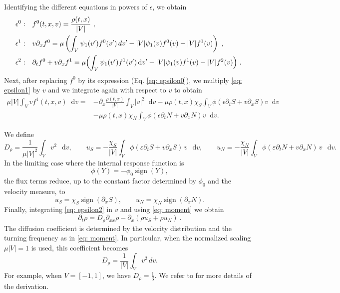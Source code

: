 \documentclass[11pt,twoside]{article}
\DeclareMathOperator{\sign}{sign}
\newcommand*\diff{\mathop{}\!\mathrm{d}}
\theoremstyle{plain}
\theoremstyle{nonumberplain}
\begin{document}
\noindent Identifying the different equations in powers of $\epsilon$, we obtain
\fi
\begin{align}
    \epsilon^0: & \quad f^0(t,{x},{v})=\frac{\rho(t,{x})}{|V|}\ ,\label{eq: epsilon0}\\
    \epsilon^1: & \quad 
    v \partial_x f^0
=
\mu \left(
\int_V \psi_1(v') f^0(v')\,dv'
- |V| \psi_1(v) f^0(v)
- |V| f^1(v)
\right)\ ,\label{eq: epsilon1}\\
    \epsilon^2: & \quad \partial_tf^0+{v}\partial_x f^1 =\mu\Bigl(\int_V\psi_1(v')f^1(v')\diff v'-|V|\psi_1(v)f^1(v)-|V|f^2(v)\Bigr) \ \label{eq: epsilon2}.\
\end{align}
Next, after replacing $f^0$ by its expression (Eq. \eqref{eq: epsilon0}), we multiply \eqref{eq: epsilon1} by ${v}$ and we integrate again with respect to ${v}$ to obtain
\begin{align}
    \mu|V|\int_V vf^1(t,x,v) \diff v=&-\partial_x\frac{\rho(t,x)}{|V|}\int_V |v|^2\diff v-\mu\rho(t,x)\chi_S\int_V\phi(\epsilon\partial_tS+v\partial_xS)v\diff v\nonumber\\ &-\mu\rho(t,x)\chi_N\int_V\phi(\epsilon\partial_tN+v\partial_xN)v\diff v.\label{eq: mean direction}
\end{align}

We define
\begin{equation}
D_\rho
=
\frac{1}{\mu |V|^2}\int_V v^2\,\diff v,
\qquad
u_S
=
-\frac{\chi_S}{|V|}
\int_V \phi(\varepsilon\partial_t S+v\partial_x S)\,v\,\diff v,
\qquad
u_N
=
-\frac{\chi_N}{|V|}
\int_V \phi(\varepsilon\partial_t N+v\partial_x N)\,v\,\diff v .
\label{eq: moment}
\end{equation}
In the limiting case where the internal response function is
\[
\phi(Y)=-\phi_0\sign(Y),
\]
the flux terms reduce, up to the constant factor determined by
$\phi_0$ and the velocity measure, to
\[
u_S=\chi_S\sign(\partial_x S),
\qquad
u_N=\chi_N\sign(\partial_x N).
\]
Finally, integrating \eqref{eq: epsilon2} in ${v}$ and using \eqref{eq: moment} we obtain
\[
\partial_t\rho=D_\rho\partial_{xx}\rho-\partial_x(\rho u_S+\rho u_N)\ .
\]
{\color{red}
The diffusion coefficient is determined by the velocity distribution and
the turning frequency as in \eqref{eq: moment}. 
In particular, when the normalized scaling \(\mu |V|=1\) is used, this
coefficient becomes
\begin{equation}
\label{def:Drho}
  D_\rho
=
\frac1{|V|}
\int_V v^2\,dv .  
\end{equation}
For example, when \( V = [-1,1] \), we have $D_\rho = \frac{1}{3}$.
}
We refer to \cite{emako2015existence,emako2016traveling} for more details of the derivation.
\end{document}
